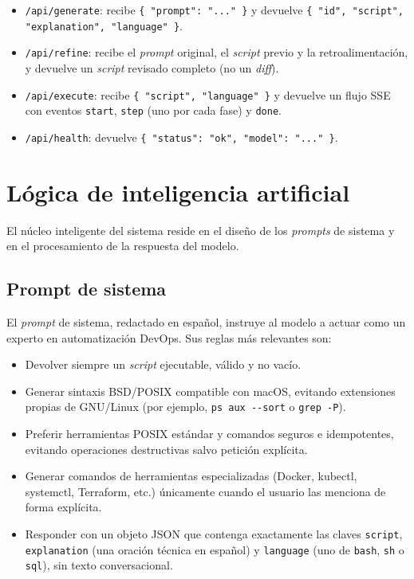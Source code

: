 \documentclass[12pt,a4paper]{article}
\begin{document}
\begin{itemize}
    \item \texttt{/api/generate}: recibe \texttt{\{ "prompt": "..." \}} y
    devuelve \texttt{\{ "id", "script", "explanation", "language" \}}.
    \item \texttt{/api/refine}: recibe el \textit{prompt} original, el
    \textit{script} previo y la retroalimentación, y devuelve un \textit{script}
    revisado completo (no un \textit{diff}).
    \item \texttt{/api/execute}: recibe \texttt{\{ "script", "language" \}} y
    devuelve un flujo SSE con eventos \texttt{start}, \texttt{step} (uno por
    cada fase) y \texttt{done}.
    \item \texttt{/api/health}: devuelve \texttt{\{ "status": "ok", "model":
    "..." \}}.
\end{itemize}

\section{Lógica de inteligencia artificial}

El núcleo inteligente del sistema reside en el diseño de los \textit{prompts} de
sistema y en el procesamiento de la respuesta del modelo.

\subsection{Prompt de sistema}

El \textit{prompt} de sistema, redactado en español, instruye al modelo a actuar
como un experto en automatización DevOps. Sus reglas más relevantes son:

\begin{itemize}
    \item Devolver siempre un \textit{script} ejecutable, válido y no vacío.
    \item Generar sintaxis BSD/POSIX compatible con macOS, evitando extensiones
    propias de GNU/Linux (por ejemplo, \texttt{ps aux -{}-sort} o
    \texttt{grep -P}).
    \item Preferir herramientas POSIX estándar y comandos seguros e
    idempotentes, evitando operaciones destructivas salvo petición explícita.
    \item Generar comandos de herramientas especializadas (Docker, kubectl,
    systemctl, Terraform, etc.) únicamente cuando el usuario las menciona de
    forma explícita.
    \item Responder con un objeto JSON que contenga exactamente las claves
    \texttt{script}, \texttt{explanation} (una oración técnica en español) y
    \texttt{language} (uno de \texttt{bash}, \texttt{sh} o \texttt{sql}), sin
    texto conversacional.
\end{itemize}
\end{document}
